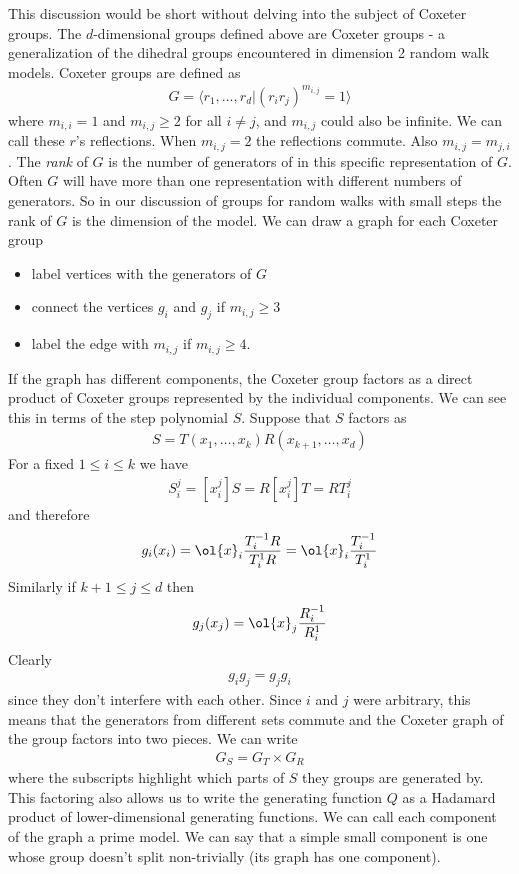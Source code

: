 This discussion would be short without delving into the subject of Coxeter groups. The $d$-dimensional groups defined above are Coxeter groups - a generalization of the dihedral groups encountered in dimension 2 random walk models. Coxeter groups are defined as
\begin{align}
	G = \langle r_1,\ldots, r_d |(r_ir_j)^{m_{i,j}} = 1\rangle
\end{align}
where $m_{i,i} = 1$ and $m_{i,j} \ge 2$ for all $i\neq j$, and $m_{i,j}$ could also be infinite. We can call these $r$'s reflections. When $m_{i,j} = 2$ the reflections commute. Also $m_{i,j} = m_{j,i}$. The \emph{rank} of $G$ is the number of generators of in this specific representation of $G$. Often $G$ will have more than one representation with different numbers of generators. So in our discussion of groups for random walks with small steps the rank of $G$ is the dimension of the model. We can draw a graph for each Coxeter group
\begin{itemize}
\item label vertices with the generators of $G$
\item connect the vertices $g_i$ and $g_j$ if $m_{i,j} \ge 3$
\item label the edge with $m_{i,j}$ if $m_{i,j}\ge 4$.
\end{itemize}
If the graph has different components, the Coxeter group factors as a direct product of Coxeter groups represented by the individual components. We can see this in terms of the step polynomial $S$. Suppose that $S$ factors as
\begin{align}
	S = T(x_1,\ldots,x_k)R(x_{k+1},\ldots,x_d)
\end{align}
For a fixed $1 \leq i \leq k$ we have
\begin{align}
	S_i^j = [x_i^j]S = R[x_i^j]T = R T_i^j
\end{align}
and therefore
\begin{align}
	g_i(x_i) = \ol{x}_i\frac{T_i^{-1}R}{T_i^1R} = \ol{x}_i\frac{T_i^{-1}}{T_i^1}
\end{align}
Similarly if $k+1\leq j\leq d$ then
\begin{align}
	g_j(x_j) = \ol{x}_j\frac{R_i^{-1}}{R_i^1}
\end{align}
Clearly
\begin{align}
	g_ig_j = g_jg_i
\end{align}
since they don't interfere with each other. Since $i$ and $j$ were arbitrary, this means that the generators from different sets commute and the Coxeter graph of the group factors into two pieces. We can write
\begin{align}
	G_S = G_T \times G_R
\end{align}
where the subscripts highlight which parts of $S$ they groups are generated by. This factoring also allows us to write the generating function $Q$ as a Hadamard product of lower-dimensional generating functions. We can call each component of the graph a prime model. We can say that a simple small component is one whose group doesn't split non-trivially (its graph has one component).

